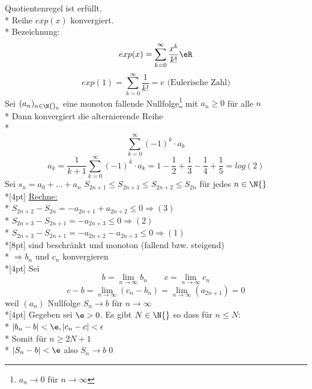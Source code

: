 \Rarr{} Quotientenregel ist erfüllt.\\*
Reihe $exp(x)$ konvergiert.\\*
Bezeichnung: $$exp(x) = \sum_{k=0}^{\infty} \frac{x^k}{k!} \eR$$
%
$$exp(1) = \sum\limits_{k=0}^{\infty} \frac{1}{k!} = e\text{ (Eulerische Zahl)}$$
Sei $(a_n)_{n \in \N{}_0}$ eine monoton fallende Nullfolge\footnote{$a_n → 0$ für $n→∞$} mit $a_n \geq 0$ für alle $n$\\*
Dann konvergiert die alternierende Reihe\\*
$$\sum_{k=0}^{\infty} (-1)^k · a_k$$
\bsp
$$a_k = \frac{1}{k + 1} \sum_{k=0}^{\infty} (-1)^k · a_k = 1 - \frac{1}{2} + \frac{1}{3} - \frac{1}{4} + \frac{1}{5}= log(2)$$
\bew
Sei $s_n = a_0 + ... + a_n$
$S_{2n + 1} \leq S_{2n + 3} \leq S_{2n + 2} \leq S_{2n}$ für jedes $n \in \N{}$\\*[4pt]
\ul{Rechne:}\\*
$S_{2n + 2} - S_{2n} = - a_{2n + 1} + a_{2n + 2} \leq 0 \Rightarrow (3)$\\*
$S_{2n + 3} - S_{2n + 1} = - a_{2n + 3} \leq 0 \Rightarrow (2)$\\*
$S_{2n + 3} - S_{2n + 1} = - a_{2n + 2} - a_{2n + 3} \leq 0 \Rightarrow (1)$\\*[8pt]
sind beschränkt und monoton (fallend bzw. steigend)\\*
$\Rightarrow b_n \text{ und } c_n$ konvergieren\\*[4pt]
Sei $$b = \lim_{n \to \infty} b_n \qquad c = \lim_{n \to \infty} c_n$$
$$c - b = \lim_{n \to \infty} (c_n - b_n) = \lim_{n \to \infty} (a_{2n + 1}) = 0$$
weil $(a_n)$ Nullfolge
$S_n \to b$ für $n \to \infty$\\*[4pt]
Gegeben sei $\e > 0$. Es gibt $N \in \N{}$ so dass für $n \leq N$:\\*
$|b_n - b| < \e, |c_n - c| < \epsilon$\\*
Somit für $n \geq 2N+1 $\\*
$|S_n - b| < \e$ also $S_n \to b$\qed